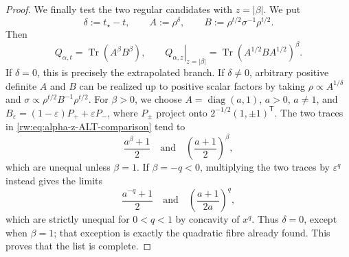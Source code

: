 \documentclass[10pt,a4paper]{amsart}
\begin{document}
\begin{proof}
We finally test the two regular candidates with
$z=\lvert\beta\rvert$.  We put
\begin{equation}
 \delta:=t_\star-t,\qquad
 A:=\rho^\delta,\qquad
 B:=\rho^{t/2}\sigma^{-1}\rho^{t/2}.
 \label{rw:eq:real-t-ALT-variables}
\end{equation}
Then
\begin{equation}
 Q_{\alpha,t}=\operatorname{Tr}(A^\beta B^\beta),
 \qquad
 \left.Q_{\alpha,z}\right|_{z=\lvert\beta\rvert}
 =\operatorname{Tr}(A^{1/2}BA^{1/2})^\beta.
 \label{rw:eq:alpha-z-ALT-comparison}
\end{equation}
If $\delta=0$, this is precisely the extrapolated branch.  If
$\delta\neq0$, arbitrary positive definite $A$ and $B$ can be
realized up to positive scalar factors by taking
$\rho\propto A^{1/\delta}$ and
$\sigma\propto\rho^{t/2}B^{-1}\rho^{t/2}$.
For $\beta>0$, we choose $A=\operatorname{diag}(a,1)$, $a>0$,
$a\neq1$, and
$B_\varepsilon=(1-\varepsilon)P_++\varepsilon P_-$, where
$P_\pm$ project onto $2^{-1/2}(1,\pm1)^{\mathsf T}$.  The two traces
in \eqref{rw:eq:alpha-z-ALT-comparison} tend to
\begin{equation}
 \frac{a^\beta+1}{2}
 \quad\text{and}\quad
 \left(\frac{a+1}{2}\right)^\beta,
 \label{rw:eq:alpha-z-strict-witness}
\end{equation}
which are unequal unless $\beta=1$.  If $\beta=-q<0$, multiplying
the two traces by $\varepsilon^q$ instead gives the limits
\begin{equation}
 \frac{a^{-q}+1}{2}
 \quad\text{and}\quad
 \left(\frac{a+1}{2a}\right)^q,
 \label{rw:eq:alpha-z-negative-strict-witness}
\end{equation}
which are strictly unequal for $0<q<1$ by concavity of $x^q$.
Thus $\delta=0$, except when $\beta=1$; that exception is exactly the
quadratic fibre already found.  This proves that the list is complete.
\end{proof}
\end{document}
